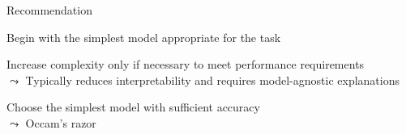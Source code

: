 \documentclass[10pt,compress,t,notes=noshow,xcolor=table]{beamer}
\begin{document}
\begin{framev}[align=top]{Recommendation}
\begin{itemizeM}
\item Begin with the simplest model appropriate for the task
\item Increase complexity only if necessary to meet performance requirements\\
$\leadsto$ Typically reduces interpretability and requires model-agnostic explanations
\item Choose the simplest model with sufficient accuracy\\
$\leadsto$ Occam's razor
\end{itemizeM}
\spacer[0.25]

\end{framev}
\end{document}
